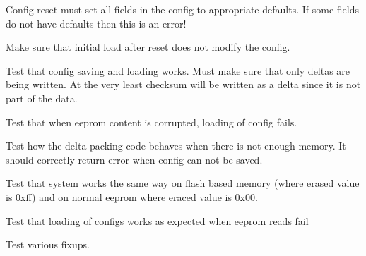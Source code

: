 
\begin{DoxyItemize}
\item Config reset must set all fields in the config to appropriate defaults. If some fields do not have defaults then this is an error!
\item Make sure that initial load after reset does not modify the config.
\item Test that config saving and loading works. Must make sure that only deltas are being written. At the very least checksum will be written as a delta since it is not part of the data.
\item Test that when eeprom content is corrupted, loading of config fails.
\item Test how the delta packing code behaves when there is not enough memory. It should correctly return error when config can not be saved.
\item Test that system works the same way on flash based memory (where erased value is 0xff) and on normal eeprom where eraced value is 0x00.
\item Test that loading of configs works as expected when eeprom reads fail
\item Test various fixups. 
\end{DoxyItemize}